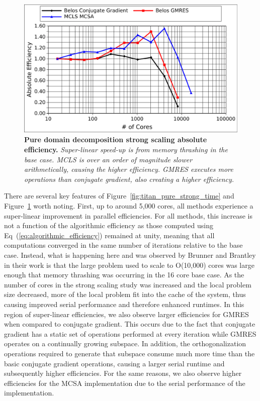 \begin{figure}[t!]
  \begin{center}
    \includegraphics[width=6in]{chapters/parallel_mc/titan_pure_strong.pdf}
  \end{center}
  \caption{\textbf{Pure domain decomposition strong scaling absolute
      efficiency.}  \textit{Super-linear speed-up is from memory
      thrashing in the base case. MCLS is over an order of magnitude
      slower arithmetically, causing the higher efficiency. GMRES
      executes more operations than conjugate gradient, also creating
      a higher efficiency.}}
  \label{fig:titan_pure_strong}
\end{figure}

There are several key features of
Figure~\ref{fig:titan_pure_strong_time} and
Figure~\ref{fig:titan_pure_strong} worth noting. First, up to around
5,000 cores, all methods experience a super-linear improvement in
parallel efficiencies. For all methods, this increase is not a
function of the algorithmic efficiency as those computed using
Eq~(\ref{eq:algorithmic_efficiency}) remained at unity, meaning that
all computations converged in the same number of iterations relative
to the base case. Instead, what is happening here and was observed by
Brunner and Brantley in their work is that the large problem used to
scale to O(10,000) cores was large enough that memory thrashing was
occurring in the 16 core base case. As the number of cores in the
strong scaling study was increased and the local problem size
decreased, more of the local problem fit into the cache of the system,
thus causing improved serial performance and therefore enhanced
runtimes. In this region of super-linear efficiencies, we also observe
larger efficiencies for GMRES when compared to conjugate
gradient. This occurs due to the fact that conjugate gradient has a
static set of operations performed at every iteration while GMRES
operates on a continually growing subspace. In addition, the
orthogonalization operations required to generate that subspace
consume much more time than the basic conjugate gradient operations,
causing a larger serial runtime and subsequently higher
efficiencies. For the same reasons, we also observe higher
efficiencies for the MCSA implementation due to the serial performance
of the implementation.


